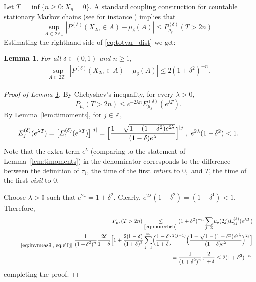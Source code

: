 \documentclass[12pt]{amsart}
\newtheorem{lemma}[theorem]{Lemma}
\begin{document}
Let $T=\inf\{n\geq 0: X_n=0\}.$ A standard coupling construction for
countable stationary Markov chains (see for instance \cite[p. 315]{durrett}) implies that
\begin{equation}
\label{eq:totvar_dist} \sup_{A\subset 2{{\mathbb Z}}_+} |
P^{(\delta)}(X_{2n}\in A)-\mu_{\delta}(A)|\le
P^{(\delta)}_{\mu_\delta}(T>2n).
\end{equation}
Estimating the righthand side of \eqref{eq:totvar_dist} we get:
\begin{lemma}
\label{lem:convrate} For all $\delta\in (0,1)$ and $n\ge 1$, \begin{eqnarray*}
\sup_{A\subset 2{{\mathbb Z}}_+} | P^{(\delta)}(X_{2n}\in
A)-\mu_{\delta}(A)|\le 2(1+\delta^2)^{-n}. \end{eqnarray*}
\end{lemma}
\begin{proof}[Proof of Lemma \ref{lem:convrate}]
By Chebyshev's inequality, for every $\lambda >0,$
\begin{equation}
\label{eq:morecheb}
P_{\mu_\delta}(T>2n) \le e^{-2\lambda n}  E^{(\delta)}_{\mu_{\delta}} ( e^{\lambda T}).
\end{equation}
By Lemma~\ref{lem:timoments}, for $j\in {{\mathbb Z}},$
\begin{equation}
\label{eq:eTj}
E^{(\delta)}_j(e^{\lambda T})=\bigl[E^{(\delta)}_1(e^{\lambda T})\bigr]^{|j|}=
\Bigl[\frac{1-\sqrt{1-(1-\delta^2)e^{2\lambda}}}{(1-\delta)e^{\lambda}}\Bigr]^{|j|},~e^{2\lambda}(1-\delta^2)<1.
\end{equation}
Note that the extra term $e^\lambda$ (comparing to the statement of
Lemma~\ref{lem:timoments}) in the denominator corresponds to the
difference between the definition of $\tau_1$, the time of the first {\sl
return} to $0,$ and $T$, the time of the first {\sl visit} to $0.$
\par
Choose $\lambda>0$ such that $e^{2\lambda}=1+\delta^2$. Clearly,
$e^{2\lambda}(1-\delta^2)=(1-\delta^4)<1$. Therefore, \begin{eqnarray*}
&& P_{\mu_\delta}(T>2n) \underset{\eqref{eq:morecheb}}{\le}
(1+\delta^2)^{-n} \sum_{j \in {{\mathbb Z}}}
\mu_{\delta}(2j) E^{(\delta)}_{2j} (e^{\lambda T})\\
&&\qquad  \underset{\eqref{eq:invmeas9},\eqref{eq:eTj}}{=}
{\frac {\displaystyle {1}}{\displaystyle {(1+\delta^2)^n} }}\frac{2\delta}{1+\delta}\Bigl[1+\frac{2(1-\delta)}{(1+\delta)^2}
\sum_{j=1}^{\infty}\Bigl(\frac{1-\delta}{1+\delta} \Bigr)^{2(j-1)}
\Bigl(\frac{1-\sqrt{1-(1-\delta^2)e^{2\lambda}}}{(1-\delta)e^{\lambda}}\Bigr)^{2j}\Bigr]
\\ &&\qquad \quad = {\frac {\displaystyle {1}}{\displaystyle {(1+\delta^2)^n} }}\frac{2}{1+\delta}
\leq 2(1+\delta^2)^{-n},
\end{eqnarray*}
completing the proof.
\end{proof}
\end{document}

